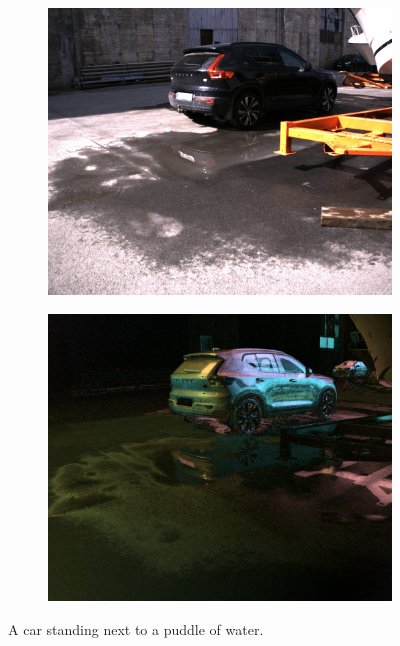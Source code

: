 \begin{figure}[H]
    \begin{subfigure}[T]{.49\textwidth}
        \includegraphics[width=\textwidth]{figures/pictures/img_1116_s0.jpg}
    \end{subfigure} \hfill
    \begin{subfigure}[T]{.49\textwidth}
        \includegraphics[width=\textwidth]{figures/pictures/img_1116_pol.jpg}
    \end{subfigure}
    \caption{A car standing next to a puddle of water.}
\end{figure}
\vspace{-.5cm}


